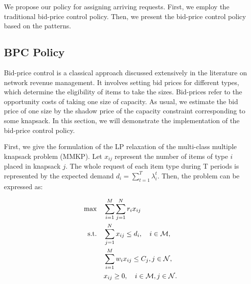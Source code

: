 We propose our policy for assigning arriving requests. First, we employ the traditional bid-price control policy. Then, we present the bid-price control policy based on the patterns.




\subsection{BPC Policy}
Bid-price control is a classical approach discussed extensively in the literature on network revenue management. It involves setting bid prices for different types, which determine the eligibility of items to take the sizes. Bid-prices refer to the opportunity costs of taking one size of capacity. As usual, we estimate the bid price of one size by the shadow price of the capacity constraint corresponding to some knapsack. In this section, we will demonstrate the implementation of the bid-price control policy. 


First, we give the formulation of the LP relaxation of the multi-class multiple knapsack problem (MMKP). Let $x_{ij}$ represent the number of items of type $i$ placed in knapsack $j$. The whole request of each item type during T periods is represented by the expected demand $d_i = \sum_{t=1}^{T} \lambda^{t}_{i}$. Then, the problem can be expressed as:

\begin{align}
\quad \max \quad & \sum_{i=1}^{M}  \sum_{j= 1}^{N} r_{i} x_{ij} \label{e0} \\
\text {s.t.} \quad & \sum_{j= 1}^{N} x_{ij} \leq d_{i}, \quad i \in \mathcal{M}, \label{deter_upper}\\ 
& \sum_{i=1}^{M} w_{i} x_{ij} \leq C_j, j \in \mathcal{N}, \label{capa_con} \\
& x_{ij} \geq 0, \quad i \in \mathcal{M}, j \in \mathcal{N}. \notag
\end{align}

